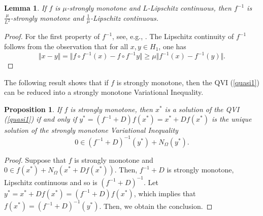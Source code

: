 \documentclass[11pt]{article}
\def\beq{\begin{equation}}
\def\eeq{\end{equation}}
\theoremstyle{plain}
\newtheorem{lemma}[theorem]{Lemma}
\newtheorem{proposition}[theorem]{Proposition}
\begin{document}
{\begin{lemma}\label{inve}
If $f$ is $\mu$-strongly monotone and $L$-Lipschitz continuous, then $f^{-1}$ is $\frac{\mu}{L^2}$-strongly monotone and $\frac{1}{\mu}$-Lipschitz continuous.
\end{lemma}

\begin{proof} For the first property of $f^{-1}$, see, e.g., \cite{IT}. The Lipschitz continuity of $f^{-1}$ follows from the observation that for all $x,y\in H_1$, one has
\[\Vert x-y \Vert=\Vert f\circ f^{-1}(x)-f\circ f^{-1}y \Vert\ge \mu \Vert f^{-1}(x) -f^{-1}(y)\Vert.
\]		
\end{proof}

The following result shows that if $f$ is strongly monotone, then  the QVI (\ref{quasi1}) can be reduced into a strongly monotone  Variational Inequality.

\begin{proposition} \label{charac}
If $f$ is strongly monotone, then $x^*$ is a solution of the QVI (\ref{quasi1}) if and only if $y^*=(f^{-1}+D)f(x^*)=x^*+Df(x^*)$ is the unique solution of the  strongly monotone Variational Inequality
\beq\label{dual}
0\in (f^{-1}+D)^{-1}(y^*)+N_\Omega (y^*).
\eeq
\end{proposition}
\begin{proof}
Suppose that $f$ is strongly monotone and $0 \in  f(x^*)+{{N_\Omega}}(x^*+Df(x^*))$. Then, $f^{-1}+D$ is strongly monotone, Lipschitz continuous and so is $(f^{-1}+D)^{-1}$.  Let $y^*=x^*+Df(x^*)=(f^{-1}+D)f(x^*)$, which implies that $f(x^*)=(f^{-1}+D)^{-1}(y^*)$. Then, we obtain the conclusion.
  \end{proof}

}
\end{document}
